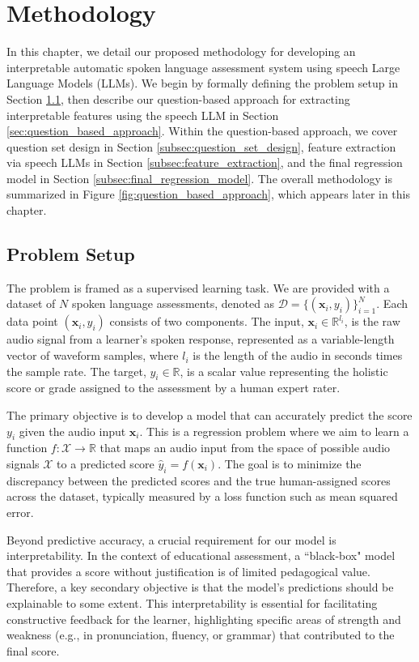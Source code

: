 \documentclass{report}
\begin{document}
\chapter{Methodology}
\label{chap:methodology}
In this chapter, we detail our proposed methodology for developing an interpretable automatic spoken language assessment system using speech Large Language Models (LLMs). We begin by formally defining the problem setup in Section \ref{sec:problem_setup}, then describe our question-based approach for extracting interpretable features using the speech LLM in Section \ref{sec:question_based_approach}. Within the question-based approach, we cover question set design in Section \ref{subsec:question_set_design}, feature extraction via speech LLMs in Section \ref{subsec:feature_extraction}, and the final regression model in Section \ref{subsec:final_regression_model}. The overall methodology is summarized in Figure \ref{fig:question_based_approach}, which appears later in this chapter.

\section{Problem Setup}
\label{sec:problem_setup}
The problem is framed as a supervised learning task. We are provided with a dataset of $N$ spoken language assessments, denoted as $\mathcal{D} = \{(\mathbf{x}_i, y_i)\}_{i=1}^N$. Each data point $(\mathbf{x}_i, y_i)$ consists of two components. The input, $\mathbf{x}_i \in \mathbb{R}^{l_i}$, is the raw audio signal from a learner's spoken response, represented as a variable-length vector of waveform samples, where $l_i$ is the length of the audio in seconds times the sample rate. The target, $y_i \in \mathbb{R}$, is a scalar value representing the holistic score or grade assigned to the assessment by a human expert rater.

The primary objective is to develop a model that can accurately predict the score $y_i$ given the audio input $\mathbf{x}_i$. This is a regression problem where we aim to learn a function $f: \mathcal{X} \to \mathbb{R}$ that maps an audio input from the space of possible audio signals $\mathcal{X}$ to a predicted score $\hat{y}_i = f(\mathbf{x}_i)$. The goal is to minimize the discrepancy between the predicted scores and the true human-assigned scores across the dataset, typically measured by a loss function such as mean squared error.

Beyond predictive accuracy, a crucial requirement for our model is interpretability. In the context of educational assessment, a ``black-box" model that provides a score without justification is of limited pedagogical value. Therefore, a key secondary objective is that the model's predictions should be explainable to some extent. This interpretability is essential for facilitating constructive feedback for the learner, highlighting specific areas of strength and weakness (e.g., in pronunciation, fluency, or grammar) that contributed to the final score.
\end{document}
